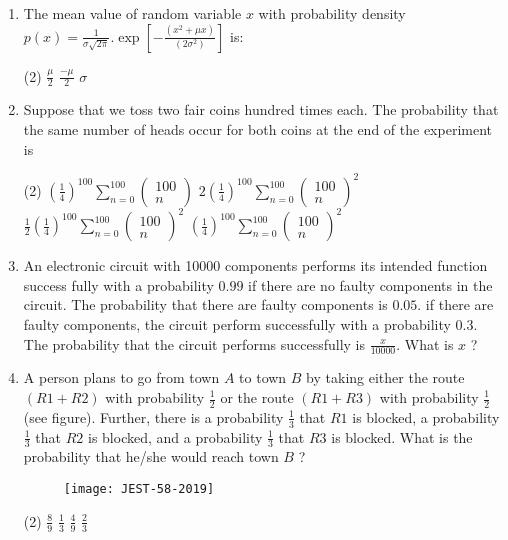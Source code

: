 \begin{enumerate}[label=\color{ocre}\textbf{\arabic*.}]
\begin{tasks}
	\end{tasks}
	\item The mean value of random variable $x$ with probability density $p(x)=\frac{1}{\sigma \sqrt{2 \pi}} . \exp \left[-\frac{\left(x^{2}+\mu x\right)}{\left(2 \sigma^{2}\right)}\right]$ is:
	{}
	\begin{tasks}(2)
		\task[\textbf{b.}]$\frac{\mu}{2}$
		\task[\textbf{c.}] $\frac{-\mu}{2}$
		\task[\textbf{d.}]  $\sigma$
	\end{tasks}
	\item Suppose that we toss two fair coins hundred times each. The probability that the same number of heads occur for both coins at the end of the experiment is
	{}
	\begin{tasks}(2)
		\task[\textbf{a.}]$\left(\frac{1}{4}\right)^{100} \sum_{n=0}^{100}\left(\begin{array}{c}100 \\ n\end{array}\right)$
		\task[\textbf{b.}] $2\left(\frac{1}{4}\right)^{100} \sum_{n=0}^{100}\left(\begin{array}{c}100 \\ n\end{array}\right)^{2}$
		\task[\textbf{c.}]$\frac{1}{2}\left(\frac{1}{4}\right)^{100} \sum_{n=0}^{100}\left(\begin{array}{c}100 \\ n\end{array}\right)^{2}$
		\task[\textbf{d.}] $\left(\frac{1}{4}\right)^{100} \sum_{n=0}^{100}\left(\begin{array}{c}100 \\ n\end{array}\right)^{2}$
	\end{tasks}
	\item An electronic circuit with 10000 components performs its intended function success fully with a probability $0.99$ if there are no faulty components in the circuit. The probability that there are faulty components is $0.05$. if there are faulty components, the circuit perform successfully with a probability $0.3$. The probability that the circuit performs successfully is $\frac{x}{10000}$. What is $x$ ?
	{}
	\item A person plans to go from town $A$ to town $B$ by taking either the route $(R 1+R 2)$ with probability $\frac{1}{2}$ or the route $(R 1+R 3)$ with probability $\frac{1}{2}$ (see figure). Further, there is a probability $\frac{1}{3}$ that $R 1$ is blocked, a probability $\frac{1}{3}$ that $R 2$ is blocked, and a probability $\frac{1}{3}$ that $R 3$ is blocked. What is the probability that he/she would reach town $B$ ?
	{}
	\begin{figure}[H]
		\centering
		\texttt{[image: JEST-58-2019]}
	\end{figure}
	\begin{tasks}(2)
		\task[\textbf{a.}]$\frac{8}{9}$
		\task[\textbf{b.}]$\frac{1}{3}$
		\task[\textbf{c.}]$\frac{4}{9}$
		\task[\textbf{d.}]$\frac{2}{3}$
	\end{tasks}
\end{enumerate}
